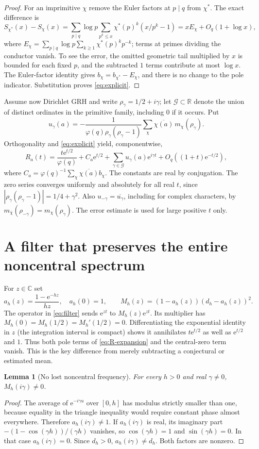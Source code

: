 \documentclass[11pt]{article}
\newtheorem{lemma}[theorem]{Lemma}
\newcommand{\R}{\mathbb R}\newcommand{\C}{\mathbb C}\newcommand{\Z}{\mathbb Z}\newcommand{\e}{\mathrm e}\newcommand{\dd}{\,\mathrm d}\newcommand{\id}{\mathrm I}\newcommand{\ord}{\operatorname{ord}}\newcommand{\Rea}{\operatorname{Re}}\newcommand{\conv}{\operatorname{conv}}\newcommand{\norm}[1]{\lVert#1\rVert}\newcommand{\ph}{\varphi(q)}
\begin{document}
\begin{proof}
For an imprimitive $\chi$ remove the Euler factors at $p\mid q$ from $\chi^*$. The exact difference is
\[
 S_{\chi^*}(x)-S_\chi(x)=
 \sum_{p\mid q}\log p\sum_{p^k\le x}\chi^*(p)^k(x/p^k-1)
 =x E_\chi+O_q(1+\log x),
\]
where $E_\chi=\sum_{p\mid q}\log p\sum_{k\ge1}\chi^*(p)^k p^{-k}$; terms at primes dividing the conductor vanish. To see the error, the omitted geometric tail multiplied by $x$ is bounded for each fixed $p$, and the subtracted $1$ terms contribute at most $\log x$. The Euler-factor identity gives $b_\chi=b_{\chi^*}-E_\chi$, and there is no change to the pole indicator. Substitution proves \eqref{eq:explicit}.
\end{proof}

Assume now Dirichlet GRH and write $\rho_\gamma=1/2+i\gamma$; let $\mathcal G\subset\R$ denote the union of distinct ordinates in the primitive family, including $0$ if it occurs. Put
\[
 u_\gamma(a)=-\frac{1}{\ph\rho_\gamma(\rho_\gamma-1)}
 \sum_\chi\overline{\chi(a)}\,m_\chi(\rho_\gamma).
\]
Orthogonality and \eqref{eq:explicit} yield, componentwise,
\begin{equation}\label{eq:R-expansion}
 R_a(t)=\frac{t\e^{t/2}}{\ph}+C_a\e^{t/2}
 +\sum_{\gamma\in\mathcal G}u_\gamma(a)\e^{i\gamma t}+O_q((1+t)\e^{-t/2}),
\end{equation}
where $C_a=\ph^{-1}\sum_\chi\overline{\chi(a)}b_\chi$. The constants are real by conjugation. The zero series converges uniformly and absolutely for all real $t$, since $|\rho_\gamma(\rho_\gamma-1)|=1/4+\gamma^2$. Also $u_{-\gamma}=\overline{u_\gamma}$, including for complex characters, by $m_{\overline\chi}(\rho_{-\gamma})=m_\chi(\rho_\gamma)$. The error estimate is used for large positive $t$ only.

\section{A filter that preserves the entire noncentral spectrum}
For $z\in\C$ set
\[
 a_h(z)=\frac{1-\e^{-hz}}{hz},\quad a_h(0)=1,\qquad
 M_h(z)=(1-a_h(z))(d_h-a_h(z))^2.
\]
The operator in \eqref{eq:filter} sends $\e^{zt}$ to $M_h(z)\e^{zt}$. Its multiplier has $M_h(0)=M_h(1/2)=M_h'(1/2)=0$. Differentiating the exponential identity in $z$ (the integration interval is compact) shows it annihilates $t\e^{t/2}$ as well as $\e^{t/2}$ and $1$. Thus both pole terms of \eqref{eq:R-expansion} and the central-zero term vanish. This is the key difference from merely subtracting a conjectural or estimated mean.

\begin{lemma}[No lost noncentral frequency]\label{lem:nonzero}
For every $h>0$ and real $\gamma\ne0$, $M_h(i\gamma)\ne0$.
\end{lemma}
\begin{proof}
The average of $\e^{-i\gamma u}$ over $[0,h]$ has modulus strictly smaller than one, because equality in the triangle inequality would require constant phase almost everywhere. Therefore $a_h(i\gamma)\ne1$. If $a_h(i\gamma)$ is real, its imaginary part $-(1-\cos(\gamma h))/(\gamma h)$ vanishes, so $\cos(\gamma h)=1$ and $\sin(\gamma h)=0$. In that case $a_h(i\gamma)=0$. Since $d_h>0$, $a_h(i\gamma)\ne d_h$. Both factors are nonzero.
\end{proof}
\end{document}
